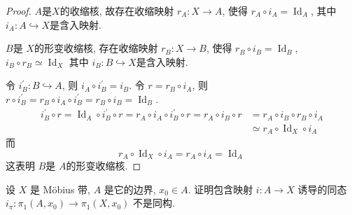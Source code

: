 \documentclass[../main.tex]{subfiles}
\begin{document}
\begin{proof}
    \(  A  \)是\(  X  \)的收缩核, 故存在收缩映射 \(  r_A:X\to A \), 使得 \(  r_A\circ i_{A}= \operatorname{Id}_{A}  \), 其中 \(  i_{A}:A\hookrightarrow X  \)是含入映射.     

    \(  B  \)是 \(  X  \)的形变收缩核, 存在收缩映射 \(  r_B:X\to B  \), 使得   \(  r_B\circ i_{B}= \operatorname{Id}_{B}  \), \(  i_{B}\circ r_B\simeq \operatorname{Id}_{X}  \)  其中 \(  i_{B}:B\hookrightarrow X  \)是含入映射.  

    令 \(  i_{B}^{\prime} : B\hookrightarrow A  \), 则 \(i_{A} \circ  i_{B}^{\prime} = i_{B}  \).  令 \(  r= r_B\circ i_{A} \), 则 \(  r\circ i_{B}^{\prime} = r_B\circ i_{A}\circ i_{B}^{\prime} = r_B\circ i_{B}= \operatorname{Id}_{B}  \).  \[
    \begin{aligned}
    i_{B}^{\prime} \circ r= \operatorname{Id}_{A}\circ i_{B}^{\prime} \circ r= r_{A}\circ i_{A}\circ i_{B}^{\prime} \circ r= r_{A}\circ i_{B}\circ r&= r_{A}\circ i_{B}\circ r_{B}\circ i_{A}\\ 
     &\simeq r_{A}\circ \operatorname{Id}_{X}\circ i_{A}
    \end{aligned}
    \] 而 \[
    r_{A}\circ \operatorname{Id}_{X}\circ i_{A}= r_{A}\circ i_{A}= \operatorname{Id}_{A}
    \] 这表明 \(  B  \)是 \(  A  \)的形变收缩核.  
\end{proof}
\begin{exercise}{}{}
设 $X$ 是 Möbius 带, $A$ 是它的边界, $x_0 \in A$. 证明包含映射 $i : A \to X$ 诱导的同态 $i_ \pi  : \pi_1(A, x_0) \to \pi_1(X, x_0)$ 不是同构.
\end{exercise}
\end{document}
